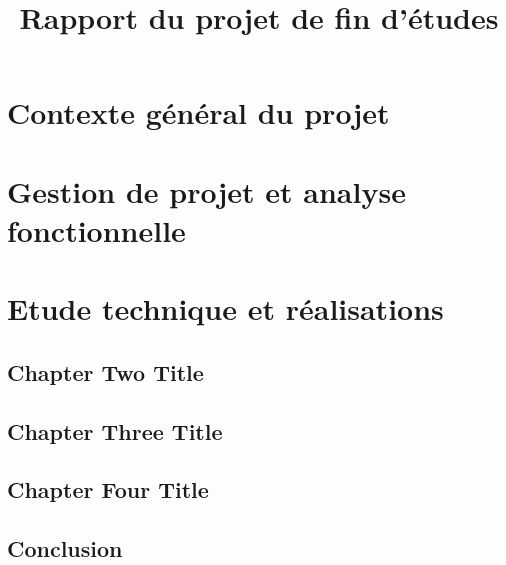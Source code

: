 \documentclass[a4paper, french, 12pt]{report}
\title{Rapport du projet de fin d'études}\let\title\@title
\begin{document}
\begin{titlepage}
  
\end{titlepage}


\ClearShipoutPicture
\newpage









\tableofcontents
\listoftables
\listoffigures

\fancyhead{}
\fancyfoot{}
\fancyfoot[LE,RO]{\thepage}


\part{Contexte général du projet}

\part{Gestion de projet et analyse fonctionnelle}
\part{Etude technique et réalisations}



\chapter{Chapter Two Title}


\chapter{Chapter Three Title}


\chapter{Chapter Four Title}


\chapter{Conclusion}

\end{document}
